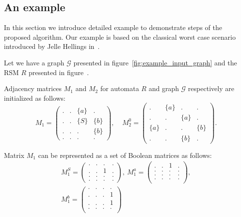 \subsection{An example}

In this section we introduce detailed example to demonstrate steps of the proposed algorithm.
Our example is based on the classical worst case scenario introduced by Jelle Hellings in~\cite{!!!}.

Let we have a graph $\mathcal{G}$ presented in figure~\ref{fig:example_input_graph} and the RSM $R$ presented in figure~\cite{!!!}.


Adjacency matrices $M_1$ and $M_2$ for automata $R$ and graph $\mathcal{G}$ respectively are initialized as follows:
    $$
    M_1 =
    \begin{pmatrix}
    . & . & \{a\} & .     \\
    . & . & \{S\} & \{b\} \\
    . & . & . & \{b\}     \\
    . & . & . & .
    \end{pmatrix}
    ,~~~~~
    M_2^0 =
    \begin{pmatrix}
    . & \{a\} & . & .     \\
    . & . & \{a\} & .     \\
    \{a\} & . & . & \{b\} \\
    . & . & \{b\} & .
    \end{pmatrix}.
    $$

Matrix $M_1$ can be represented as a set of Boolean matrices as follows:
\begin{align*}
M_1^S =
\begin{pmatrix}      
    . & . & . & .   \\
    . & . & 1 & .   \\
    . & . & . & .   \\
    . & . & . & .   
\end{pmatrix},~M_1^a =
\begin{pmatrix}       
   . & . & 1 & .   \\
   . & . & . & .   \\
   . & . & . & .   \\
   . & . & . & .   \\
\end{pmatrix}, \\ M_1^b =
\begin{pmatrix}      
    . & . & . & .   \\
    . & . & . & 1   \\
    . & . & . & 1   \\
    . & . & . & .   \\
\end{pmatrix}
\end{align*}

